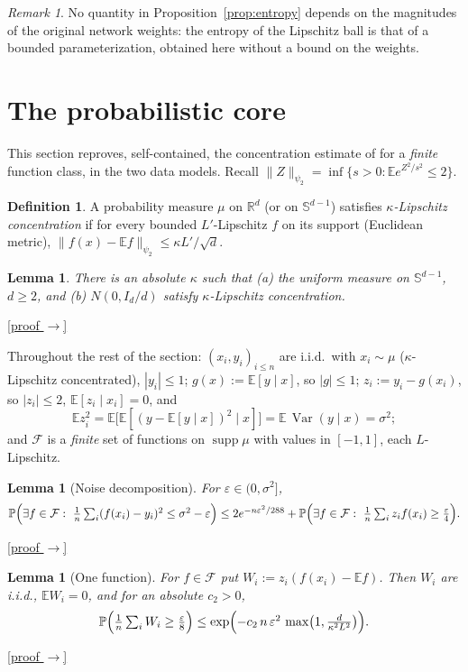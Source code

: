 \documentclass[11pt,reqno]{amsart}
\theoremstyle{plain}
\newtheorem{lemma}[theorem]{Lemma}
\theoremstyle{definition}
\newtheorem{definition}[theorem]{Definition}
\theoremstyle{remark}
\newtheorem{remark}[theorem]{Remark}
\newcommand{\R}{\mathbb{R}}
\newcommand{\Sd}{\mathbb{S}^{d-1}}
\newcommand{\PP}{\mathbb{P}}
\newcommand{\EE}{\mathbb{E}}
\newcommand{\eps}{\varepsilon}
\newcommand{\FF}{\mathcal{F}}
\DeclareMathOperator{\Var}{Var}
\newcommand{\proofbutton}[1]{\hyperref[proof:#1]{\textnormal{\footnotesize\textsf{[proof $\to$]}}}}
\begin{document}
\begin{remark}
No quantity in Proposition~\ref{prop:entropy} depends on the magnitudes of the original network weights: the entropy of the Lipschitz ball is that of a bounded parameterization, obtained here without a bound on the weights.
\end{remark}

\section{The probabilistic core}\label{sec:prob}

This section reproves, self-contained, the concentration estimate of \cite{BS} for a \emph{finite} function class, in the two data models. Recall $\|Z\|_{\psi_2}=\inf\{s>0:\EE e^{Z^2/s^2}\le2\}$.

\begin{definition}\label{def:conc}
A probability measure $\mu$ on $\R^d$ (or on $\Sd$) satisfies \emph{$\kappa$-Lipschitz concentration} if for every bounded $L'$-Lipschitz $f$ on its support (Euclidean metric),
$\|f(x)-\EE f\|_{\psi_2}\le\kappa L'/\sqrt d$.
\end{definition}

\begin{lemma}\label{lem:conc-models}
There is an absolute $\kappa$ such that (a) the uniform measure on $\Sd$, $d\ge2$, and (b) $N(0,I_d/d)$ satisfy $\kappa$-Lipschitz concentration.
\end{lemma}
\proofbutton{conc-models}

Throughout the rest of the section: $(x_i,y_i)_{i\le n}$ are i.i.d.\ with $x_i\sim\mu$ ($\kappa$-Lipschitz concentrated), $|y_i|\le1$; $g(x):=\EE[y\mid x]$, so $|g|\le1$; $z_i:=y_i-g(x_i)$, so $|z_i|\le2$, $\EE[z_i\mid x_i]=0$, and
\[
\EE z_i^2=\EE\bigl[\EE[(y-\EE[y\mid x])^2\mid x]\bigr]=\EE\,\Var(y\mid x)=\sigma^2;
\]
and $\FF$ is a \emph{finite} set of functions on $\operatorname{supp}\mu$ with values in $[-1,1]$, each $L$-Lipschitz.

\begin{lemma}[Noise decomposition]\label{lem:noise}
For $\eps\in(0,\sigma^2]$,
\[
\PP\Bigl(\exists f\in\FF:\ \tfrac1n\textstyle\sum_i(f(x_i)-y_i)^2\le\sigma^2-\eps\Bigr)\le 2e^{-n\eps^2/288}+\PP\Bigl(\exists f\in\FF:\ \tfrac1n\textstyle\sum_iz_if(x_i)\ge\tfrac\eps4\Bigr).
\]
\end{lemma}
\proofbutton{noise}

\begin{lemma}[One function]\label{lem:onef}
For $f\in\FF$ put $W_i:=z_i(f(x_i)-\EE f)$. Then $W_i$ are i.i.d., $\EE W_i=0$, and for an absolute $c_2>0$,
\[
\PP\Bigl(\tfrac1n\textstyle\sum_i W_i\ge\tfrac\eps8\Bigr)\le\exp\Bigl(-c_2\,n\,\eps^2\,\max\bigl(1,\tfrac{d}{\kappa^2L^2}\bigr)\Bigr).
\]
\end{lemma}
\proofbutton{onef}
\end{document}
